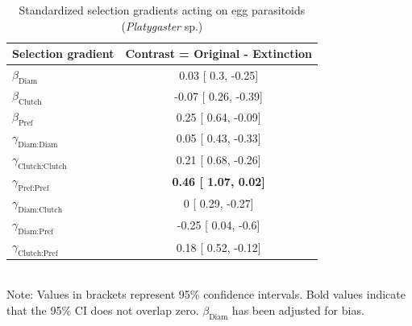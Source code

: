 \documentclass[11pt,]{article}
\begin{document}
\bigskip

\begin{table}[h]
\caption{Standardized selection gradients acting on egg parasitoids (\textit{Platygaster} sp.)}
\label{Table:ExtendedGradients}
\centering
\begin{tabular}{lc}
\\ 
\hline
\textbf{Selection gradient} & \textbf{Contrast = Original - Extinction}  \\ 
\hline
$\beta_{\text{Diam}}$ & 

0.03 [
0.3,
-0.25] \\

$\beta_{\text{Clutch}}$ & 

-0.07 [
0.26,
-0.39] \\

$\beta_{\text{Pref}}$ &

0.25 [
0.64,
-0.09] \\

$\gamma_{\text{Diam:Diam}}$ &

0.05 [
0.43,
-0.33] \\

$\gamma_{\text{Clutch:Clutch}}$ & 

0.21 [
0.68,
-0.26] \\

$\gamma_{\text{Pref:Pref}}$ & 

\textbf{
0.46 [
1.07,
0.02] }\\

$\gamma_{\text{Diam:Clutch}}$ & 

0 [
0.29,
-0.27] \\

$\gamma_{\text{Diam:Pref}}$ & 

-0.25 [
0.04,
-0.6] \\

$\gamma_{\text{Clutch:Pref}}$ & 

0.18 [
0.52,
-0.12] \\ 
\hline
\end{tabular}
\bigskip{}
\\
{\footnotesize Note: Values in brackets represent 95\% confidence intervals. Bold values indicate that the 95\% CI does not overlap zero. $\beta_{\text{Diam}}$ has been adjusted for bias.}
\end{table}
\end{document}
